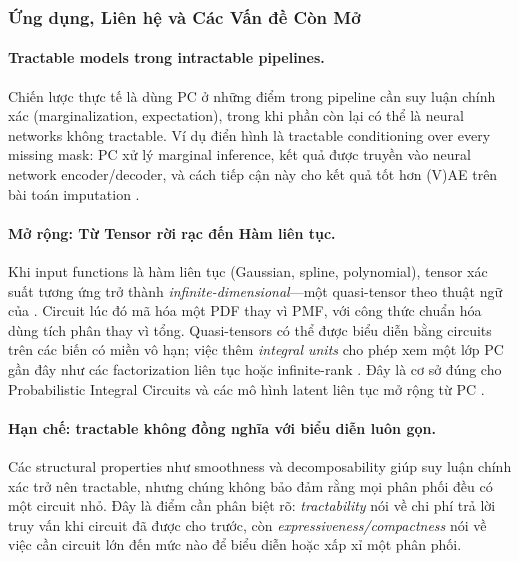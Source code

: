 \subsubsection{Ứng dụng, Liên hệ và Các Vấn đề Còn Mở}

\paragraph{Tractable models trong intractable pipelines.}
Chiến lược thực tế là dùng PC ở những điểm trong pipeline cần suy luận chính xác
(marginalization, expectation), trong khi phần còn lại có thể là neural networks
không tractable.  Ví dụ điển hình là tractable conditioning over every missing mask:
PC xử lý marginal inference, kết quả được truyền vào neural network encoder/decoder,
và cách tiếp cận này cho kết quả tốt hơn (V)AE trên bài toán imputation
\cite{braun2025tractable}.

\paragraph{Mở rộng: Từ Tensor rời rạc đến Hàm liên tục.}
Khi input functions là hàm liên tục (Gaussian, spline, polynomial), tensor xác suất
tương ứng trở thành \emph{infinite-dimensional}---một quasi-tensor theo thuật ngữ
của \cite{loconte2025relationship}.  Circuit lúc đó mã hóa một PDF thay vì PMF,
với công thức chuẩn hóa dùng tích phân thay vì tổng.  Quasi-tensors có thể được
biểu diễn bằng circuits trên các biến có miền vô hạn; việc thêm \emph{integral
units} cho phép xem một lớp PC gần đây như các factorization liên tục hoặc
infinite-rank \cite{loconte2025relationship}.  Đây là cơ sở đúng cho Probabilistic
Integral Circuits và các mô hình latent liên tục mở rộng từ PC
\cite{loconte2025relationship, gala2024probabilisticIntegral, gala2024scalingContinuous}.

\paragraph{Hạn chế: tractable không đồng nghĩa với biểu diễn luôn gọn.}
Các structural properties như smoothness và decomposability giúp suy luận chính xác
trở nên tractable, nhưng chúng không bảo đảm rằng mọi phân phối đều có một circuit
nhỏ.  Đây là điểm cần phân biệt rõ: \emph{tractability} nói về chi phí trả lời truy
vấn khi circuit đã được cho trước, còn \emph{expressiveness/compactness} nói về việc
cần circuit lớn đến mức nào để biểu diễn hoặc xấp xỉ một phân phối.

